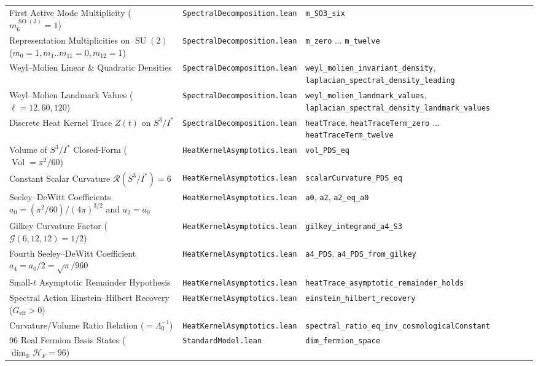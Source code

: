 \documentclass[11pt,a4paper]{article}
\theoremstyle{definition}
\DeclareMathOperator{\Vol}{Vol}
\DeclareMathOperator{\SU}{SU}
\DeclareMathOperator{\SO}{SO}
\begin{document}
\begin{table}[htbp]
\begin{tabularx}{\textwidth}{llX}
First Active Mode Multiplicity ($m_6^{\SO(3)} = 1$) & \texttt{SpectralDecomposition.lean} & \texttt{m\_SO3\_six} \\
Representation Multiplicities on $\SU(2)$ ($m_0=1, m_1..m_{11}=0, m_{12}=1$) & \texttt{SpectralDecomposition.lean} & \texttt{m\_zero} $\dots$ \texttt{m\_twelve} \\
Weyl--Molien Linear \& Quadratic Densities & \texttt{SpectralDecomposition.lean} & \texttt{weyl\_molien\_invariant\_density}, \texttt{laplacian\_spectral\_density\_leading} \\
Weyl--Molien Landmark Values ($\ell = 12, 60, 120$) & \texttt{SpectralDecomposition.lean} & \texttt{weyl\_molien\_landmark\_values}, \texttt{laplacian\_spectral\_density\_landmark\_values} \\
Discrete Heat Kernel Trace $Z(t)$ on $S^3/I^*$ & \texttt{SpectralDecomposition.lean} & \texttt{heatTrace}, \texttt{heatTraceTerm\_zero} $\dots$ \texttt{heatTraceTerm\_twelve} \\
Volume of $S^3/I^*$ Closed-Form ($\Vol = \pi^2/60$) & \texttt{HeatKernelAsymptotics.lean} & \texttt{vol\_PDS\_eq} \\
Constant Scalar Curvature $\mathcal{R}(S^3/I^*) = 6$ & \texttt{HeatKernelAsymptotics.lean} & \texttt{scalarCurvature\_PDS\_eq} \\
Seeley--DeWitt Coefficients $a_0 = (\pi^2/60)/(4\pi)^{3/2}$ and $a_2 = a_0$ & \texttt{HeatKernelAsymptotics.lean} & \texttt{a0}, \texttt{a2}, \texttt{a2\_eq\_a0} \\
Gilkey Curvature Factor ($\mathcal{G}(6,12,12) = 1/2$) & \texttt{HeatKernelAsymptotics.lean} & \texttt{gilkey\_integrand\_a4\_S3} \\
Fourth Seeley--DeWitt Coefficient $a_4 = a_0/2 = \sqrt{\pi}/960$ & \texttt{HeatKernelAsymptotics.lean} & \texttt{a4\_PDS}, \texttt{a4\_PDS\_from\_gilkey} \\
Small-$t$ Asymptotic Remainder Hypothesis & \texttt{HeatKernelAsymptotics.lean} & \texttt{heatTrace\_asymptotic\_remainder\_holds} \\
Spectral Action Einstein--Hilbert Recovery ($G_{\mathrm{eff}} > 0$) & \texttt{HeatKernelAsymptotics.lean} & \texttt{einstein\_hilbert\_recovery} \\
Curvature/Volume Ratio Relation ($= \Lambda_0^{-1}$) & \texttt{HeatKernelAsymptotics.lean} & \texttt{spectral\_ratio\_eq\_inv\_cosmologicalConstant} \\
96 Real Fermion Basis States ($\dim_{\mathbb{R}} \mathcal{H}_F = 96$) & \texttt{StandardModel.lean} & \texttt{dim\_fermion\_space} \\

\end{tabularx}
\end{table}
\end{document}
